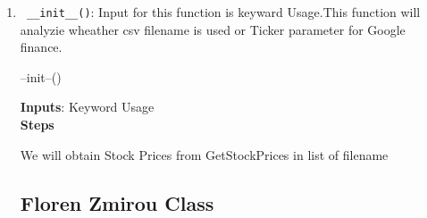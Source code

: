 \begin{enumerate}
\begin{algorithm}
  \end{algorithm}
  \item \verb! __init__()!: Input for this function is keyward Usage.This function will analyzie wheather csv filename is used or Ticker parameter 
  for Google finance.
  \begin{algorithm}
  \caption{--init--()}
  \bigskip
  \textbf{Inputs}: Keyword Usage \\
  \textbf{Steps}
  \begin{algorithmic}[1]
  \State We  will obtain Stock Prices from GetStockPrices in list of filename
  \end{algorithmic}
  \end{algorithm}
\subsection{Floren Zmirou Class}

\end{enumerate}
